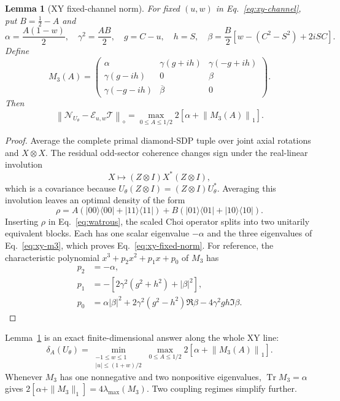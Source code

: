 \documentclass[11pt,a4paper]{article}
\newtheorem{lemma}{Lemma}
\theoremstyle{remark}
\newcommand{\Tr}{\operatorname{Tr}}
\newcommand{\cE}{\mathcal{E}}
\newcommand{\cN}{\mathcal{N}}
\newcommand{\cT}{\mathcal{T}}
\newcommand{\diamondnorm}[1]{\left\lVert #1\right\rVert_{\diamond}}
\newcommand{\tracenorm}[1]{\left\lVert #1\right\rVert_{1}}
\begin{document}
\begin{lemma}[XY fixed-channel norm]
\label{lem:xy-fixed}
For fixed $(u,w)$ in Eq.~\eqref{eq:xy-channel}, put
$B=\frac12-A$ and
\[
 \alpha=\frac{A(1-w)}2,\quad \gamma^2=\frac{AB}{2},\quad
 g=C-u,\quad h=S,\quad
 \beta=\frac{B}{2}\left[w-(C^2-S^2)+2iSC\right].
\]
Define
\begin{equation}
 M_3(A)=
 \begin{pmatrix}
 \alpha&\gamma(g+ih)&\gamma(-g+ih)\\
 \gamma(g-ih)&0&\beta\\
 \gamma(-g-ih)&\overline\beta&0
 \end{pmatrix}.
 \label{eq:xy-m3}
\end{equation}
Then
\begin{equation}
 \diamondnorm{\cN_{U_\theta}-\cE_{u,w}\cT}
 =\max_{0\leq A\leq1/2}
 2\left[\alpha+\tracenorm{M_3(A)}\right].
 \label{eq:xy-fixed-norm}
\end{equation}
\end{lemma}

\begin{proof}
Average the complete primal diamond-SDP tuple over joint axial rotations and
$X\otimes X$.  The residual odd-sector coherence changes sign under the
real-linear involution
\[
 X\longmapsto(Z\otimes I)X^*(Z\otimes I),
 \]
which is a covariance because
$U_\theta(Z\otimes I)=(Z\otimes I)U_\theta^*$.  Averaging this involution leaves
an optimal density of the form
\[
 \rho=A(|00\rangle\langle00|+|11\rangle\langle11|)
 +B(|01\rangle\langle01|+|10\rangle\langle10|).
\]
Inserting $\rho$ in Eq.~\eqref{eq:watrous}, the scaled Choi operator splits
into two unitarily equivalent blocks.  Each has one scalar eigenvalue
$-\alpha$ and the three eigenvalues of Eq.~\eqref{eq:xy-m3}, which proves
Eq.~\eqref{eq:xy-fixed-norm}.  For reference, the characteristic polynomial
$x^3+p_2x^2+p_1x+p_0$ of $M_3$ has
\begin{align*}
 p_2&=-\alpha,\\
 p_1&=-\left[2\gamma^2(g^2+h^2)+|\beta|^2\right],\\
 p_0&=\alpha|\beta|^2
 +2\gamma^2(g^2-h^2)\Re\beta
 -4\gamma^2gh\Im\beta.
\end{align*}
\end{proof}

Lemma~\ref{lem:xy-fixed} is an exact finite-dimensional answer along the whole
XY line:
\begin{equation}
 \delta_A(U_\theta)=
 \min_{\substack{-1\leq w\leq1\\|u|\leq(1+w)/2}}
 \max_{0\leq A\leq1/2}
 2\left[\alpha+\tracenorm{M_3(A)}\right].
 \label{eq:xy-minmax}
\end{equation}
Whenever $M_3$ has one nonnegative and two nonpositive eigenvalues,
$\Tr M_3=\alpha$ gives
$2[\alpha+\|M_3\|_1]=4\lambda_{\max}(M_3)$.
Two coupling regimes simplify further.
\end{document}
